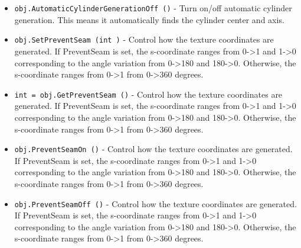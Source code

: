 \begin{itemize}
\item  \verb|obj.AutomaticCylinderGenerationOff ()| -  Turn on/off automatic cylinder generation. This means it automatically
 finds the cylinder center and axis.

\item  \verb|obj.SetPreventSeam (int )| -  Control how the texture coordinates are generated. If PreventSeam is
 set, the s-coordinate ranges from 0->1 and 1->0 corresponding to the
 angle variation from 0->180 and 180->0. Otherwise, the s-coordinate
 ranges from 0->1 from 0->360 degrees.

\item  \verb|int = obj.GetPreventSeam ()| -  Control how the texture coordinates are generated. If PreventSeam is
 set, the s-coordinate ranges from 0->1 and 1->0 corresponding to the
 angle variation from 0->180 and 180->0. Otherwise, the s-coordinate
 ranges from 0->1 from 0->360 degrees.

\item  \verb|obj.PreventSeamOn ()| -  Control how the texture coordinates are generated. If PreventSeam is
 set, the s-coordinate ranges from 0->1 and 1->0 corresponding to the
 angle variation from 0->180 and 180->0. Otherwise, the s-coordinate
 ranges from 0->1 from 0->360 degrees.

\item  \verb|obj.PreventSeamOff ()| -  Control how the texture coordinates are generated. If PreventSeam is
 set, the s-coordinate ranges from 0->1 and 1->0 corresponding to the
 angle variation from 0->180 and 180->0. Otherwise, the s-coordinate
 ranges from 0->1 from 0->360 degrees.

\end{itemize}
